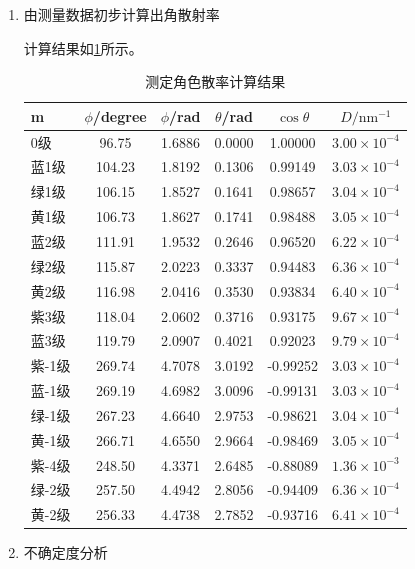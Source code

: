 \documentclass[dvipsnames, svgnames,a4paper,11pt]{article}
\begin{document}
	\begin{enumerate}
		\item 由测量数据初步计算出角散射率
		
		计算结果如\cref{tab:tab6}所示。
		\begin{table}[htbp]
			\centering
			\caption{测定角色散率计算结果}
			\begin{tabular}{|l|c|c|c|c|c|}
				\hline
				m & $\phi$/degree & $\phi$/rad & $\theta$/rad & $\cos{\theta}$ & $D/\text{nm}^{-1}$ \\
				\hline
				0级 & 96.75 & 1.6886 & 0.0000 & 1.00000 & $3.00\times 10^{-4}$ \\
				蓝1级 & 104.23 & 1.8192 & 0.1306 & 0.99149 & $3.03\times 10^{-4}$ \\
				绿1级 & 106.15 & 1.8527 & 0.1641 & 0.98657 & $3.04\times 10^{-4}$ \\
				黄1级 & 106.73 & 1.8627 & 0.1741 & 0.98488 & $3.05\times 10^{-4}$ \\
				蓝2级 & 111.91 & 1.9532 & 0.2646 & 0.96520 & $6.22\times 10^{-4}$ \\
				绿2级 & 115.87 & 2.0223 & 0.3337 & 0.94483 & $6.36\times 10^{-4}$ \\
				黄2级 & 116.98 & 2.0416 & 0.3530 & 0.93834 & $6.40\times 10^{-4}$ \\
				紫3级 & 118.04 & 2.0602 & 0.3716 & 0.93175 & $9.67\times 10^{-4}$ \\
				蓝3级 & 119.79 & 2.0907 & 0.4021 & 0.92023 & $9.79\times 10^{-4}$ \\
				紫-1级 & 269.74 & 4.7078 & 3.0192 & -0.99252 & $3.03\times 10^{-4}$ \\
				蓝-1级 & 269.19 & 4.6982 & 3.0096 & -0.99131 & $3.03\times 10^{-4}$ \\
				绿-1级 & 267.23 & 4.6640 & 2.9753 & -0.98621 & $3.04\times 10^{-4}$ \\
				黄-1级 & 266.71 & 4.6550 & 2.9664 & -0.98469 & $3.05\times 10^{-4}$ \\
				紫-4级 & 248.50 & 4.3371 & 2.6485 & -0.88089 & $1.36\times 10^{-3}$ \\
				绿-2级 & 257.50 & 4.4942 & 2.8056 & -0.94409 & $6.36\times 10^{-4}$ \\
				黄-2级 & 256.33 & 4.4738 & 2.7852 & -0.93716 & $6.41\times 10^{-4}$ \\
				\hline
			\end{tabular}
			\label{tab:tab6}
		\end{table}
		
		\item 不确定度分析
		

\end{enumerate}
\end{document}
